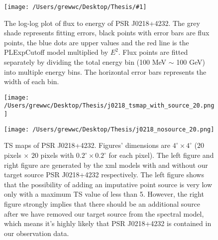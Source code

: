 \documentclass[12pt]{report}
\newcommand{\singleFig}[3]{
  \begin{figure}[!ht]
    \centering
    \texttt{[image: /Users/grewwc/Desktop/Thesis/\#1]}
    \caption{#3}
    \label{fig: #1}
  \end{figure}
}
\newcommand{\change}[1]{
  $<$\colorbox{red}{\textbf{change}}$>$#1$<$\colorbox{red}{\textbf{/change}}$>$
}
\begin{document}
            \singleFig{j0218_cur.png}{0.40}{The log-log plot of flux to energy of PSR J0218+4232. The grey shade represents 
              fitting errors, black points with error bars are flux points, the blue dots are upper values and the 
              red line is the PLExpCutoff model multiplied by $E^2$. Flux points 
              are fitted separately by dividing the total energy bin (100 MeV $\sim$ 100 GeV) into multiple energy bins.
              The horizontal error bars represents the width of each bin. }
            \vspace{1cm}
            \begin{figure}[!ht]
              \begin{center}
              \begin{minipage}{0.46\textwidth}
                \begin{center} 
                  \texttt{[image: /Users/grewwc/Desktop/Thesis/j0218\_tsmap\_with\_source\_20.png]}
                \end{center}
              \end{minipage}
              \begin{minipage}{0.45\textwidth}
                \begin{center}
                  \texttt{[image: /Users/grewwc/Desktop/Thesis/j0218\_nosource\_20.png]}
                \end{center}
              \end{minipage}
            \end{center}
            \caption{TS maps of PSR J0218+4232. Figures' dimensions are 
            $4^{\circ} \times 4^{\circ}$ ($20$ pixels $\times$ $20$ pixels with 
            $0.2^{\circ} \times 0.2^{\circ}$ for each pixel). The \textsf{left}
            figure and \textsf{right} figure are generated by the xml models with and without our 
            target source PSR J0218+4232 respectively. The \textsf{left} figure shows that the 
            possibility of adding an imputative point source is very low only with a maximum TS value of 
            less than 5. However, the \textsf{right} figure strongly implies that there should be an 
            additional source after we have removed our target source from the spectral model, 
            which means it's highly likely that PSR J0218+4232 is contained in our observation data.}
            \label{fig: j0218_tsmap_comparison_20}
            \end{figure}
\end{document}
